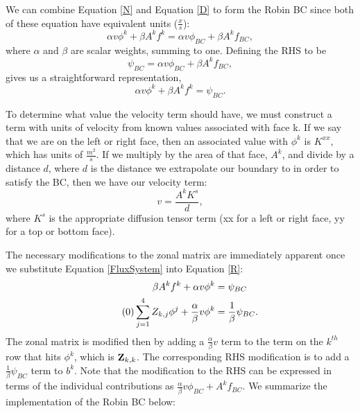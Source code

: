 \documentclass[11pt,letterpaper,oneside,notitlepage]{article}	%
\newcommand{\yestag}{\tag{\theequation}\stepcounter{equation}}	%
\newcommand{\eq}[1]{Equation \eqref{#1}}		%
\numberwithin{equation}{section}				%
\begin{document}
We can combine \eq{N} and \eq{D} to form the Robin BC since both of these equation have equivalent units ($\frac{x}{s}$):
\begin{equation}
\alpha v \phi^k + \beta A^k f^k = \alpha v \phi_{BC} + \beta A^k f_{BC} \label{RobinFull}
,\end{equation}
where $\alpha$ and $\beta$ are scalar weights, summing to one. Defining the RHS to be 
\begin{equation}
\psi_{BC} =  \alpha v \phi_{BC} + \beta A^k f_{BC}
,\end{equation}
gives us a straightforward representation,
\begin{equation}
\alpha v \phi^k + \beta A^k f^k = \psi_{BC} \label{R}
.\end{equation}

To determine what value the velocity term should have, we must construct a term with units of velocity from known values associated with face k. If we say that we are on the left or right face, then an associated value with $\phi^k$ is $K^{xx}$, which has units of $\frac{m^2}{s}$. If we multiply by the area of that face, $A^k$, and divide by a distance $d$, where $d$ is the distance we extrapolate our boundary to in order to satisfy the BC, then we have our velocity term:
\begin{equation} 
v=\frac{A^k K^{s}}{d},
\end{equation}
where $K^s$ is the appropriate diffusion tensor term (xx for a left or right face, yy for a top or bottom face).

The necessary modifications to the zonal matrix are immediately apparent once we substitute \eq{FluxSystem} into \eq{R}:
\begin{align*}
\beta A^k f^k +\alpha v \phi^k  &= \psi_{BC} \\ \yestag
 \sum_{j=1}^4 Z_{k,j} \phi^j + \frac{\alpha}{\beta} v \phi^k  &= \frac{1}{\beta}\psi_{BC} 
.\end{align*}
The zonal matrix is modified then by adding a $\frac{\alpha}{\beta} v$ term to the term on the $k^{th}$ row that hits $\phi^k$, which is ${\bf Z}_{k,k}$. The corresponding RHS modification is to add a $\frac{1}{\beta}\psi_{BC}$ term to $b^k$. Note that the modification to the RHS can be expressed in terms of the individual contributions as $\frac{\alpha}{\beta} v \phi_{BC} + A^k f_{BC}$. We summarize the implementation of the Robin BC below:
\end{document}

